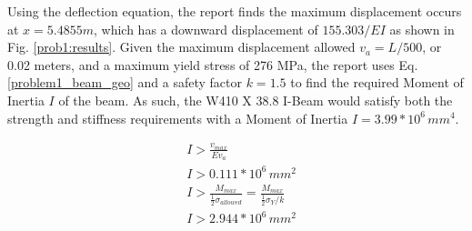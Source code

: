 \documentclass[a4paper]{article}
\begin{document}
Using the deflection equation, the report finds the maximum displacement occurs at $x = 5.4855 m$, which has a downward displacement of $155.303/EI$ as shown in Fig. \ref{prob1:results}. Given the maximum displacement allowed $v_a = L/500$, or 0.02 meters, and a maximum yield stress of 276 MPa, the report uses Eq. \ref{problem1_beam_geo} and a safety factor $k=1.5$ to find the required Moment of Inertia $I$ of the beam. As such, the W410 X 38.8 I-Beam would satisfy both the strength and stiffness requirements with a Moment of Inertia $I=3.99 * 10^6\,{mm}^4$.

\begin{equation}
\begin{split}
& I > \frac{v_{max}}{Ev_a} \\
& I > 0.111 * 10^6\,{mm}^2 \\
& I > \frac{M_{max}}{\frac{1}{2}\sigma_{allowed}} = \frac{M_{max}}{\frac{1}{2}\sigma_Y/ k}\\
& I > 2.944 * 10^6\,{mm}^2 \\
\end{split}
\label{problem1_beam_geo}
\end{equation}
\end{document}
